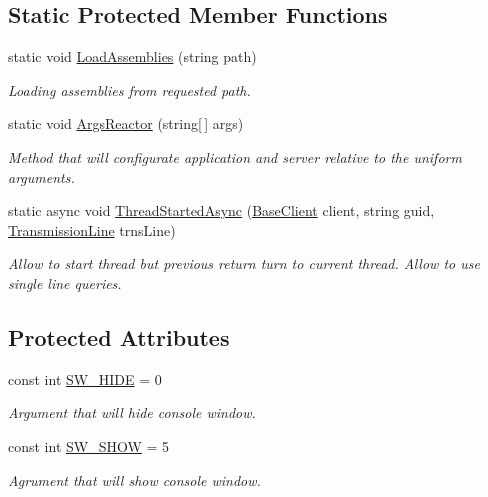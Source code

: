 \subsection*{Static Protected Member Functions}
\begin{DoxyCompactItemize}
\item 
static void \mbox{\hyperlink{class_uniform_client_1_1_base_client_a8abbd1d46cc50556eeae8bbd55ce680f}{Load\+Assemblies}} (string path)
\begin{DoxyCompactList}\small\item\em Loading assemblies from requested path. \end{DoxyCompactList}\item 
static void \mbox{\hyperlink{class_uniform_client_1_1_base_client_a7ec48981cf3e7ec10d2cb7dff81f912a}{Args\+Reactor}} (string\mbox{[}$\,$\mbox{]} args)
\begin{DoxyCompactList}\small\item\em Method that will configurate application and server relative to the uniform arguments. \end{DoxyCompactList}\item 
static async void \mbox{\hyperlink{class_uniform_client_1_1_base_client_adef20cc9f9fc1b44f6994c26a9475195}{Thread\+Started\+Async}} (\mbox{\hyperlink{class_uniform_client_1_1_base_client}{Base\+Client}} client, string guid, \mbox{\hyperlink{class_pipes_provider_1_1_client_1_1_transmission_line}{Transmission\+Line}} trns\+Line)
\begin{DoxyCompactList}\small\item\em Allow to start thread but previous return turn to current thread. Allow to use single line queries. \end{DoxyCompactList}\end{DoxyCompactItemize}
\subsection*{Protected Attributes}
\begin{DoxyCompactItemize}
\item 
const int \mbox{\hyperlink{class_uniform_client_1_1_base_client_a6060f2eb1d44ec518f2dfc99c8b4f7aa}{S\+W\+\_\+\+H\+I\+DE}} = 0
\begin{DoxyCompactList}\small\item\em Argument that will hide console window. \end{DoxyCompactList}\item 
const int \mbox{\hyperlink{class_uniform_client_1_1_base_client_a7545b9c72eef6cb7594a7001d3f558e4}{S\+W\+\_\+\+S\+H\+OW}} = 5
\begin{DoxyCompactList}\small\item\em Agrument that will show console window. \end{DoxyCompactList}\end{DoxyCompactItemize}
